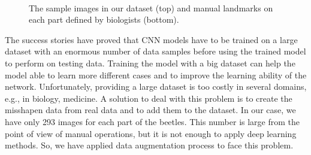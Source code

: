 \documentclass[review]{elsarticle}
\begin{document}
\begin{figure}[h!]
~~
~~
~\\
    \caption{The sample images in our dataset (top) and manual landmarks on each part defined by biologists (bottom).}
    \label{figdatasamples}
\end{figure}

The success stories \cite{krizhevsky2012imagenet, ciregan2012multi, szegedy2015going} have proved that CNN models have to be trained on a large dataset with an enormous number of data samples before using the trained model to perform on testing data. Training the model with a big dataset can help the model able to learn more different cases and to improve the learning ability of the network. Unfortunately, providing a large dataset is too costly in several domains, e.g., in biology, medicine. A solution to deal with this problem is to create the misshapen data from real data and to add them to the dataset. In our case, we have only 293 images for each part of the beetles. This number is large from the point of view of manual operations, but it is not enough to apply deep learning methods. So, we have applied data augmentation process to face this problem.
\end{document}

